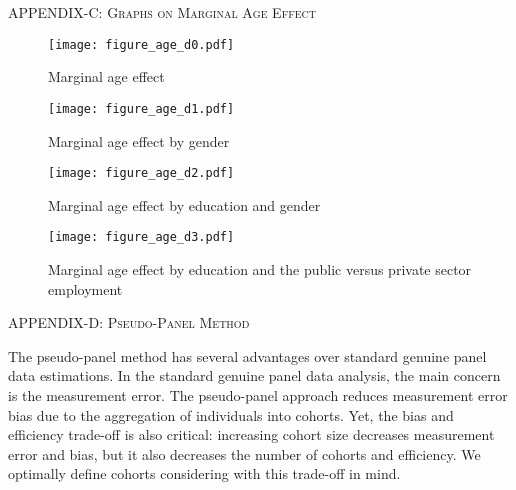 \documentclass[12pt,author-year]{article}
\begin{document}
\pagebreak

\renewcommand{\thefigure}{C\arabic{figure}} 
\setcounter{figure}{0}   

\begin{center}
	\label{AppendixC}
	\textsc{\large{APPENDIX-C: Graphs on Marginal Age Effect}}
\end{center}

\begin{figure}[H]
	\centering
	\texttt{[image: figure\_age\_d0.pdf]}
	\caption{Marginal age effect}
\end{figure}

\begin{figure}[H]
	\centering
	\texttt{[image: figure\_age\_d1.pdf]}
	\caption{Marginal age effect by gender}
\end{figure}

\begin{figure}[H]
	\centering
	\texttt{[image: figure\_age\_d2.pdf]}
	\caption{Marginal age effect by education and gender}
\end{figure}

\begin{figure}[H]
	\centering
	\texttt{[image: figure\_age\_d3.pdf]}
	\caption{Marginal age effect by education and the public versus private sector employment}
\end{figure}

\pagebreak

\begin{center}
	\label{AppendixD}
	\textsc{\large{APPENDIX-D: Pseudo-Panel Method}}
\end{center}



The pseudo-panel method has several advantages over standard genuine panel data estimations. In the standard genuine panel data analysis, the main concern is the measurement error. The pseudo-panel approach reduces measurement error bias due to the aggregation of individuals into cohorts. Yet, the bias and efficiency trade-off is also critical: increasing cohort size decreases measurement error and bias, but it also decreases the number of cohorts and efficiency. We optimally define cohorts considering with this trade-off in mind.
\end{document}
